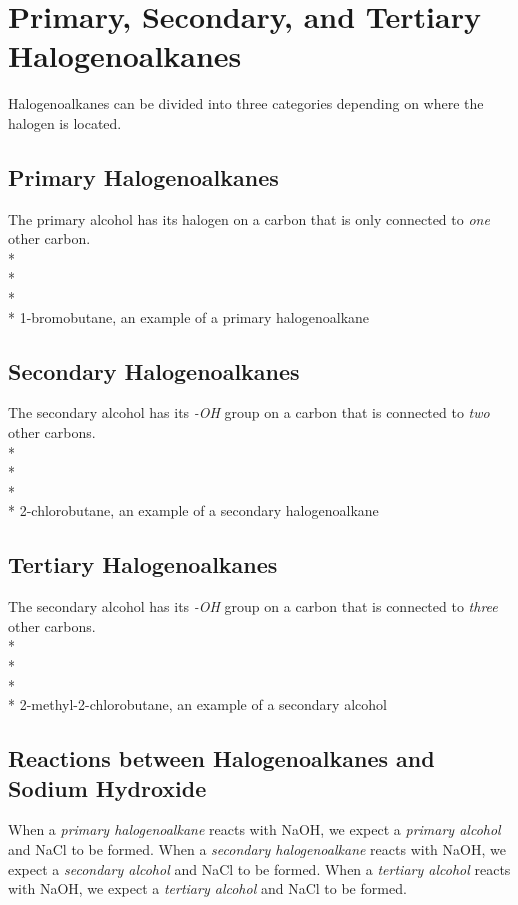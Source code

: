 \documentclass[11pt,twoside]{article}
\begin{document}
	\section{Primary, Secondary, and Tertiary Halogenoalkanes}
		Halogenoalkanes can be divided into three categories depending on where the halogen is located.
		\subsection{Primary Halogenoalkanes}
			The primary alcohol has its halogen on a carbon that is only connected to \emph{one} other carbon. 
			\\* \\*
			\\* \\*
			1-bromobutane, an example of a primary halogenoalkane
		\subsection{Secondary Halogenoalkanes}
			The secondary alcohol has its \emph{-OH} group on a carbon that is connected to \emph{two} other carbons.
			\\* \\*
			\\* \\*
			2-chlorobutane, an example of a secondary halogenoalkane
		\subsection{Tertiary Halogenoalkanes}
			The secondary alcohol has its \emph{-OH} group on a carbon that is connected to \emph{three} other carbons.
			\\* \\*
			\\* \\*
			2-methyl-2-chlorobutane, an example of a secondary alcohol
		\subsection{Reactions between Halogenoalkanes and Sodium Hydroxide}
			When a \emph{primary halogenoalkane} reacts with NaOH, we expect a \emph{primary alcohol} and NaCl to be formed. When a \emph{secondary halogenoalkane} reacts with NaOH, we expect a \emph{secondary alcohol} and NaCl to be formed. When a \emph{tertiary alcohol} reacts with NaOH, we expect a \emph{tertiary alcohol} and NaCl to be formed.
			
\end{document}
